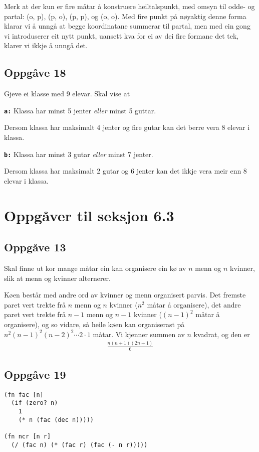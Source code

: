 \documentclass[a4paper, 11pt]{article}
\newcommand{\deloppg}[1]{\vspace{1mm}\noindent \textbf{\tt \themecolor{#1:}}}
\newcommand{\themeshade}{Mahogany}
\newcommand{\themecolor}[1]{\textcolor{\themeshade}{#1}}
\begin{document}
Merk at der kun er fire måtar å konstruere heiltalspunkt, med omsyn til odde- og partal:
(o, p), (p, o), (p, p), og (o, o).
Med fire punkt på nøyaktig denne forma klarar vi å unngå at begge koordinatane summerar
til partal, men med ein gong vi introduserer eit nytt punkt, uansett kva for ei av dei
fire formane det tek, klarer vi ikkje å unngå det.


\newpage
\subsection*{Oppgåve 18}
Gjeve ei klasse med 9 elevar. Skal vise at

\deloppg{a} Klassa har minst 5 jenter {\em eller} minst 5 guttar.

Dersom klassa har maksimalt 4 jenter og fire gutar kan det berre vera 8 elevar i klassa.

\deloppg{b} Klassa har minst 3 gutar {\em eller} minst 7 jenter.

Dersom klassa har maksimalt 2 gutar og 6 jenter kan det ikkje vera meir enn 8 elevar i klassa.


\section*{Oppgåver til seksjon 6.3}
\subsection*{Oppgåve 13}
Skal finne ut kor mange måtar ein kan organisere ein kø av \(n\) menn og \(n\) kvinner, slik at
menn og kvinner alternerer.

Køen består med andre ord av kvinner og menn organisert parvis. Det fremste paret vert trekte frå
\(n\) menn og \(n\) kvinner (\(n^2\) måtar å organisere), det andre paret vert trekte frå \(n-1\)
menn og \(n-1\) kvinner (\((n-1)^2\) måtar å organisere), og so vidare, så heile køen kan organiserast på
\(n^2(n-1)^2(n-2)^2 \cdots 2 \cdot 1\) måtar. Vi kjenner summen av \(n\) kvadrat, og den er
\begin{align*}
    \frac{n(n+1)(2n+1)}{6}
\end{align*}


\subsection*{Oppgåve 19}
\begin{lstlisting}
(fn fac [n]
  (if (zero? n)
    1
    (* n (fac (dec n)))))

(fn ncr [n r]
  (/ (fac n) (* (fac r) (fac (- n r)))))
\end{lstlisting}
\end{document}
